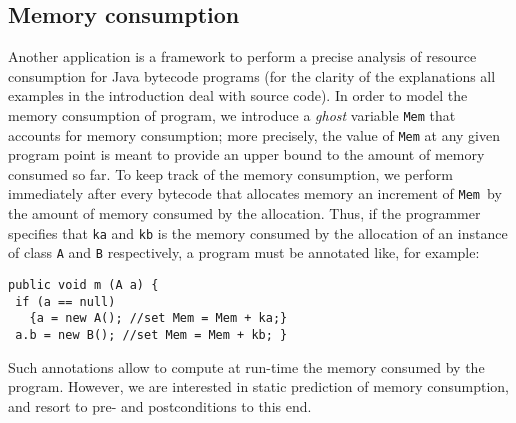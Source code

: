 \subsection{Memory consumption}
Another application is a framework to perform a precise analysis of resource consumption for
Java bytecode programs (for the clarity of the explanations all
examples in the introduction deal with source code).  
In order to model the memory consumption of program, we introduce
a {\em ghost} variable \verb!Mem! that accounts for
memory consumption; more precisely, the value of \verb!Mem! at any
given program point is meant to provide an upper bound to the amount
of memory consumed so far. To keep track of the memory consumption, we
perform immediately after every bytecode that allocates memory an
increment of \verb!Mem!\ by the amount of memory consumed by the
allocation. Thus, if the programmer specifies that \verb!ka! and
\verb!kb! is the memory consumed by the allocation of an instance of
class \verb!A! and \verb!B! respectively, a program must be
annotated like, for example:
\begin{verbatim} 
public void m (A a) {
 if (a == null) 
   {a = new A(); //set Mem = Mem + ka;}  
 a.b = new B(); //set Mem = Mem + kb; }
\end{verbatim}
Such annotations allow to compute at run-time the memory consumed by
the program. However, we are interested in static prediction of memory
consumption, and resort to pre- and postconditions to this end.  
